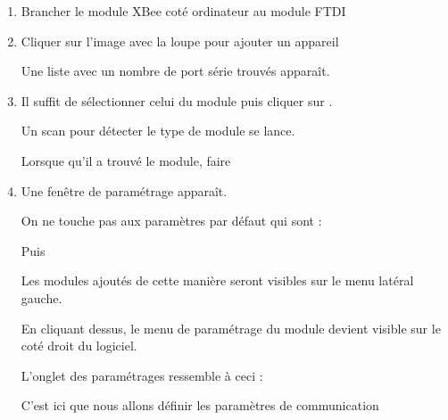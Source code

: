 \begin{enumerate}
\item  Brancher le module XBee coté ordinateur au module FTDI 

\item Cliquer sur l'image avec la loupe pour ajouter un appareil 




Une liste avec un nombre de port série trouvés apparaît.


\item Il suffit de sélectionner celui du module puis cliquer sur .

Un scan pour détecter le type de module se lance.


Lorsque qu'il a trouvé le module, faire 

\item Une fenêtre de paramétrage apparaît.


On ne touche pas aux paramètres par défaut qui sont : 


Puis 

Les modules ajoutés de cette manière seront visibles sur le menu latéral gauche.



En cliquant dessus, le menu de paramétrage du module devient visible sur le coté droit du logiciel.

L'onglet des paramétrages ressemble à ceci : 


C'est ici que nous allons définir les paramètres de communication 

\end{enumerate}

